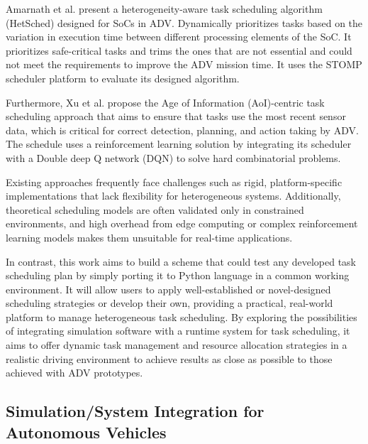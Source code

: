 \documentclass[conference]{IEEEtran}
\begin{document}
Amarnath et al. \cite{amarnath2021} present a heterogeneity-aware task scheduling algorithm (HetSched) designed for SoCs in ADV. Dynamically prioritizes tasks based on the variation in execution time between different processing elements of the SoC. It prioritizes safe-critical tasks and trims the ones that are not essential and could not meet the requirements to improve the ADV mission time. It uses the STOMP scheduler platform \cite{vega2020}  to evaluate its designed algorithm.

Furthermore, Xu et al. \cite{Xu2022} propose the Age of Information (AoI)-centric task scheduling approach that aims to ensure that tasks use the most recent sensor data, which is critical for correct detection, planning, and action taking by ADV. The schedule uses a reinforcement learning solution by integrating its scheduler with a Double deep Q network (DQN) to solve hard combinatorial problems. %

Existing approaches frequently face challenges such as rigid, platform-specific implementations that lack flexibility for heterogeneous systems. Additionally, theoretical scheduling models are often validated only in constrained environments, and high overhead from edge computing or complex reinforcement learning models makes them unsuitable for real-time applications.



In contrast, this work aims to build a scheme that could test any developed task scheduling plan by simply porting it to Python language in a common working environment. It will allow users to apply well-established or novel-designed scheduling strategies or develop their own, providing a practical, real-world platform to manage heterogeneous task scheduling. By exploring the possibilities of integrating simulation software with a runtime system for task scheduling, it aims to offer dynamic task management and resource allocation strategies in a realistic driving environment to achieve results as close as possible to those achieved with ADV prototypes. 



\subsection{Simulation/System Integration for Autonomous Vehicles}
\end{document}
